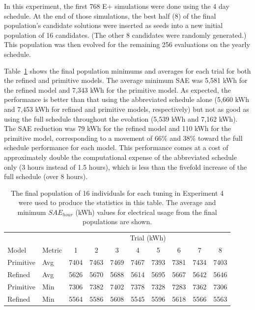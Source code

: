 \documentclass[preprint, review, 12pt]{elsarticle}
\begin{document}
In this experiment, the first 768 E+ simulations were done using the 4 day schedule. At the end of those simulations, the best half (8) of the final population's candidate solutions were inserted as seeds into a new initial population of 16 candidates. (The other 8 candidates were randomly generated.) This population was then evolved for the remaining 256 evaluations on the yearly schedule.

Table~\ref{tab:hourly-serial} shows the final population minimums and averages for each trial for both the refined and primitive models. The average minimum SAE was 5,581 kWh for the refined model and 7,343 kWh for the primitive model. As expected, the performance is better than that using the abbreviated schedule alone (5,660 kWh and 7,453 kWh for refined and primitive models, respectively) but not as good as using the full schedule throughout the evolution (5,539 kWh and 7,162 kWh). The SAE reduction was 79 kWh for the refined model and 110 kWh for the primitive model, corresponding to a movement of 66\% and 38\% toward the full schedule performance for each model. This performance comes at a cost of approximately double the computational expense of the abbreviated schedule only (3 hours instead of 1.5 hours), which is less than the fivefold increase of the full schedule (over 8 hours). 


\begin{table}[htbp]
\centering
\caption{The final population of 16 individuals for each tuning in Experiment 4 were used to produce the statistics in this table. The average and minimum $SAE_{hour}$ (kWh) values for electrical usage from the final populations are shown.}
\label{tab:hourly-serial}
\begin{tabular}{llcccccccc}
\toprule
 &  & \multicolumn{8}{c}{Trial (kWh)}\\
Model & Metric & 1 & 2 & 3 & 4 & 5 & 6 & 7 & 8\\
\midrule
Primitive & Avg & 7404 & 7463 & 7469 & 7467 & 7393 & 7381 & 7434 & 7403\\\rowcolor{DarkRow}
Refined   & Avg & 5626 & 5670 & 5688 & 5614 & 5695 & 5667 & 5642 & 5646\\
Primitive & Min & 7306 & 7382 & 7402 & 7378 & 7328 & 7283 & 7362 & 7306\\\rowcolor{DarkRow}
Refined   & Min & 5564 & 5586 & 5608 & 5545 & 5596 & 5618 & 5566 & 5563\\
\bottomrule
\end{tabular}
\end{table}
\end{document}

